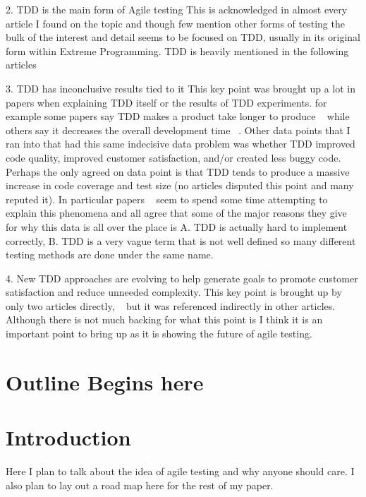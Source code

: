 \documentclass{sig-alternate}
\begin{document}
2. TDD is the main form of Agile testing
This is acknowledged in almost every article I found on the topic and though few mention other forms of testing the bulk of the interest and detail seems to be focused on TDD, usually in its original form within Extreme Programming.  TDD is heavily mentioned in the following articles ~\cite{George:2003, Hammond:2012, Hellman:2012, lemos:2012, Kettunen:2010, Talby:2006} 


3. TDD has inconclusive results tied to it
This key point was brought up a lot in papers when explaining TDD itself or the results of TDD experiments.  for example some papers say TDD makes a product take longer to produce ~\cite{Lemos:2012, Hammond:2012} while others say it decreases the overall development time ~\cite{Kettunen:2010}.  Other data points that I ran into that had this same indecisive data problem was whether TDD improved code quality, improved customer satisfaction, and/or created less buggy code.  Perhaps the only agreed on data point is that TDD tends to produce a massive increase in code coverage and test size (no articles disputed this point and many reputed it).  In particular papers ~\cite{Hammond:2012, Hellman:2012, Kettunen:2010} seem to spend some time attempting to explain this phenomena and all agree that some of the major reasons they give for why this data is all over the place is A. TDD is actually hard to implement correctly, B. TDD is a very vague term that is not well defined so many different testing methods are done under the same name.
 

4. New TDD approaches are evolving to help generate goals to promote customer satisfaction and reduce unneeded complexity.
This key point is brought up by only two articles directly, ~\cite{Soeken:2012 , Hammond:2012} but it was referenced indirectly in other articles.  Although there is not much backing for what this point is I think it is an important point to bring up as it is showing the future of agile testing.


\section{Outline Begins here}

\section{Introduction}
Here I plan to talk about the idea of agile testing and why anyone should care. I also plan to lay out a road map here for the rest of my paper.
\end{document}
